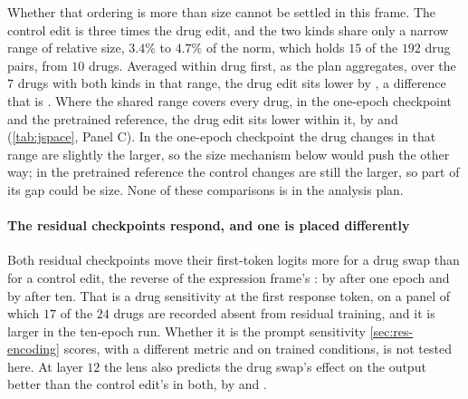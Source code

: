 Whether that ordering is more than size cannot be settled in this frame. The
control edit is three times the drug edit, and the two kinds share only a narrow
range of relative size, $3.4\%$ to $4.7\%$ of the norm, which holds $15$ of the
$192$ drug pairs, from $10$ drugs. Averaged within drug first, as the plan
aggregates, over the $7$ drugs with both kinds in that range, the drug edit sits
lower by , a difference that is \notestablished.
Where the shared range covers every drug, in the one-epoch checkpoint and the
pretrained reference, the drug edit sits lower within it, by
 and 
(\cref{tab:jspace}, Panel C). In the one-epoch checkpoint the drug changes in that
range are slightly the larger, so the size mechanism below would push the other
way; in the pretrained reference the control changes are still the larger, so
part of its gap could be size. None of these comparisons is in the analysis
plan.

\paragraph{The residual checkpoints respond, and one is placed differently} Both
residual checkpoints move their first-token logits more for a drug swap than for
a control edit, the reverse of the expression frame's
: by  after one epoch and by
 after ten. That is a drug sensitivity at the first
response token, on a panel of which $17$ of the $24$ drugs are recorded absent
from residual training, and it is larger in the ten-epoch run. Whether it is the
prompt sensitivity \cref{sec:res-encoding} scores, with a different metric and on
trained conditions, is not tested here. At layer $12$ the lens also predicts the
drug swap's effect on the output better than the control edit's in both, by
 and .

